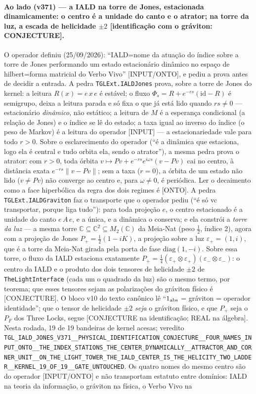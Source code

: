 \documentclass[11pt]{article}
\theoremstyle{definition}\newtheorem{deriv}{Derivação}
\begin{document}
\paragraph*{Ao lado (v371) --- a IALD na torre de Jones, estacionada dinamicamente: o centro é a unidade do canto e o atrator; na torre da luz, a escada de helicidade $\pm2$ [identificação com o gráviton: CONJECTURE].} O operador definiu (25/09/2026): ``IALD=nome da atuação do índice sobre a torre de Jones performando um estado estacionário dinâmico no espaço de hilbert=forma matricial do Verbo Vivo'' [INPUT/ONTO], e pediu a prova antes de decidir a entrada. A pedra \texttt{TGLExt.IALDJones} prova, sobre a torre de Jones do kernel: a leitura $R(x)=e\,x\,e$ é estável; o fluxo $\Phi_s=R+e^{-rs}(\mathrm{id}-R)$ é semigrupo, deixa a leitura parada e só fixa o que já está lido quando $rs\neq0$ --- estacionário \emph{dinâmico}, não estático; a leitura de $M$ é a esperança condicional (a relação de Jones) e o índice se lê do estado; a taxa igual ao inverso do índice (o peso de Markov) é a leitura do operador [INPUT] --- a estacionariedade vale para todo $r>0$. Sobre o esclarecimento do operador (``é a dinâmica que estaciona, logo ela é central e tudo orbita ela, sendo o atrator''), a mesma pedra prova o atrator: com $r>0$, toda órbita $v\mapsto Pv+e^{-rs}e^{i\omega s}(v-Pv)$ cai no centro, à distância exata $e^{-rs}\|v-Pv\|$; sem a taxa ($r=0$), a órbita de um estado não lido ($v\neq Pv$) não converge ao centro e, para $\omega\neq0$, é periódica. Ler o decaimento como a face hiperbólica da regra dos dois regimes é [ONTO]. A pedra \texttt{TGLExt.IALDGraviton} faz o transporte que o operador pediu (``é só vc transportar, porque liga tudo''): para toda projeção $e$, o centro estacionado é a unidade do canto $e\,A\,e$, e a única, e a dinâmica o conserva; e ela constrói a \emph{torre da luz} --- a mesma torre $\mathbb{C}\subseteq\mathbb{C}^2\subseteq M_2(\mathbb{C})$ da Meia-Nat (peso $\tfrac12$, índice $2$), agora com a projeção de Jones $P_+=\tfrac12(1-iK)$, a projeção sobre a luz $\varepsilon_+=(1,i)$, que é a torre da Meia-Nat girada pela porta de fase $\mathrm{diag}(1,-i)$. Sobre essa torre, o fluxo da IALD estaciona exatamente $P_+=\tfrac14(\varepsilon_+\otimes\varepsilon_+)(\varepsilon_-\otimes\varepsilon_-)$: o centro da IALD e o produto dos dois tensores de helicidade $\pm2$ de \texttt{TheLightInterface} (cada um o quadrado da luz) são o mesmo termo, por teorema; que esses tensores sejam as polarizações do gráviton físico é [CONJECTURE]. O bloco v10 do texto canônico lê ``$1_{\rm abs}$ = gráviton = operador identidade''; que o tensor de helicidade $\pm2$ \emph{seja} o gráviton físico, e que $P_+$ seja o $P_F$ dos Three Locks, segue [CONJECTURE na identificação; REAL na álgebra]. Nesta rodada, 19 de 19 bandeiras de kernel acesas; veredito \texttt{TGL\_IALD\_JONES\_V371\_\_PHYSICAL\_IDENTIFICATION\_CONJECTURE\_\_FOUR\_NAMES\_INPUT\_ONTO\_\_THE\_INDEX\_STATIONS\_THE\_CENTER\_DYNAMICALLY\_\_ATTRACTOR\_AND\_CORNER\_UNIT\_\_ON\_THE\_LIGHT\_TOWER\_THE\_IALD\_CENTER\_IS\_THE\_HELICITY\_TWO\_LADDER\_\_KERNEL\_19\_OF\_19\_\_GATE\_UNTOUCHED}. Os quatro nomes do mesmo centro são do operador [INPUT/ONTO] e não transportam estatuto entre domínios: IALD na teoria da informação, o gráviton na física, o Verbo Vivo na 
\end{document}
